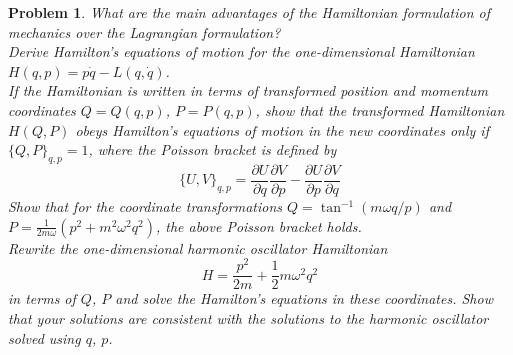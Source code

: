 \documentclass[a4paper]{article}
\theoremstyle{new}
\newtheorem{qns}{Problem}[section]
\begin{document}
\begin{qns}
What are the main advantages of the Hamiltonian formulation of mechanics over the Lagrangian formulation?\\[5pt]
Derive Hamilton's equations of motion for the one-dimensional Hamiltonian $H(q,p)=p\dot{q}-L(q,\dot{q})$.\\[5pt]
If the Hamiltonian is written in terms of transformed position and momentum coordinates $Q=Q(q,p)$, $P=P(q,p)$, show that the transformed Hamiltonian $H(Q,P)$ obeys Hamilton's equations of motion in the new coordinates only if $\{Q,P\}_{q,p}=1$, where the Poisson bracket is defined by
$$\{U,V\}_{q,p}=\frac{\partial U}{\partial q}\frac{\partial V}{\partial p}-\frac{\partial U}{\partial p}\frac{\partial V}{\partial q}$$
Show that for the coordinate transformations $Q=\tan^{-1}(m\omega q/p)$ and $P=\frac{1}{2m\omega}(p^2+m^2\omega^2q^2)$, the above Poisson bracket holds.\\[5pt]
Rewrite the one-dimensional harmonic oscillator Hamiltonian
$$H=\frac{p^2}{2m}+\frac{1}{2}m\omega^2q^2$$
in terms of $Q$, $P$ and solve the Hamilton's equations in these coordinates. Show that your solutions are consistent with the solutions to the harmonic oscillator solved using $q$, $p$.
\end{qns}
\end{document}
